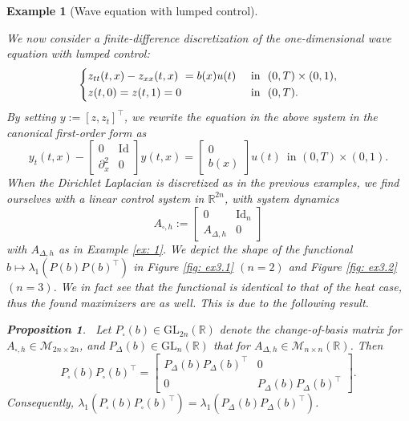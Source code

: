 \documentclass[journal,twoside,web]{ieeecolor}
\newcommand{\del}{\partial}
\newcommand{\R}{\mathbb{R}}
\newtheorem{proposition}{Proposition}
\newtheorem{example}{Example}
\begin{document}
	\begin{example}[Wave equation with lumped control] \label{ex: 3}
	
	We now consider a finite-difference discretization of the one-dimensional wave equation with lumped control: 
	\begin{equation*}
	\begin{dcases}
	z_{tt}(t,x) - z_{xx}(t,x) = b(x)u(t) &\text{ in } (0,T)\times(0,1),\\
	z(t,0) = z(t,1) = 0 &\text{ in } (0,T).
	\end{dcases}	
	\end{equation*}
	By setting $y:=[z, z_t]^\top$, we rewrite the equation in the above system in the canonical first-order form as
	\begin{equation*}
	y_t(t,x) - \begin{bmatrix}0&\mathrm{Id}\\ \del_x^2&0\end{bmatrix}y(t,x) = \begin{bmatrix}0\\b(x)\end{bmatrix} u(t) \, \text{ in } (0,T)\times(0,1).
	\end{equation*}
	When the Dirichlet Laplacian is discretized as in the previous examples, we find ourselves with a linear control system in $\R^{2n}$, with system dynamics
	\begin{equation*}
	A_{\square, h}:= \begin{bmatrix} 0&\mathrm{Id}_n\\
						      A_{\Delta,h}&0
	\end{bmatrix}
	\end{equation*}
	with $A_{\Delta, h}$ as in Example \ref{ex: 1}. We depict the shape of the functional $b\mapsto \lambda_1(P(b)P(b)^\top)$ in Figure \ref{fig: ex3.1} $(n=2)$ and Figure \ref{fig: ex3.2} $(n=3)$. 
	We in fact see that the functional is identical to that of the heat case, thus the found maximizers are as well. This is due to the following result.
	
	\begin{proposition} \label{prop: wave=heat} Let $P_{\square}(b)\in\mathrm{GL}_{2n}(\R)$ denote the change-of-basis matrix for $A_{\square,h}\in\mathcal{M}_{2n\times 2n}$, and $P_{\Delta}(b)\in\mathrm{GL}_n(\R)$ that for $A_{\Delta,h}\in\mathcal{M}_{n\times n}(\R)$. Then 
	\begin{equation}
	P_\square(b)P_\square(b)^\top = \begin{bmatrix} P_{\Delta}(b)P_{\Delta}(b)^\top & 0\\ 0 & P_{\Delta}(b)P_{\Delta}(b)^\top\end{bmatrix}.
	\end{equation}
	Consequently, $\lambda_1\left(P_\square(b)P_\square(b)^\top\right) = \lambda_1\left(P_{\Delta}(b)P_{\Delta}(b)^\top\right)$.
	\end{proposition}
	

\end{example}
\end{document}
